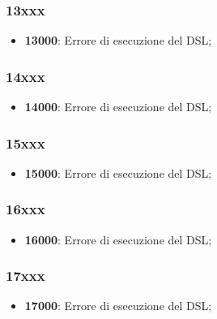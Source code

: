\subsubsection{13xxx}

\begin{itemize}

	\item \textbf{13000}: Errore di esecuzione del DSL;

\end{itemize}

\subsubsection{14xxx}

\begin{itemize}

	\item \textbf{14000}: Errore di esecuzione del DSL;

\end{itemize}

\subsubsection{15xxx}

\begin{itemize}

	\item \textbf{15000}: Errore di esecuzione del DSL;

\end{itemize}

\subsubsection{16xxx}

\begin{itemize}

	\item \textbf{16000}: Errore di esecuzione del DSL;

\end{itemize}

\subsubsection{17xxx}

\begin{itemize}

	\item \textbf{17000}: Errore di esecuzione del DSL;

\end{itemize}

